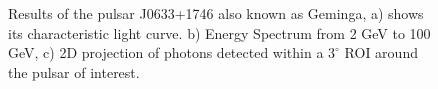 \documentclass{PoS}
\begin{document}
\begin{figure}
\centering
{}

\caption{Results of the pulsar J0633+1746 also known as Geminga, a)  shows its characteristic  light curve. b) Energy Spectrum from 2 GeV to 100 GeV, c) 2D projection of photons detected within a $ 3^{\circ}$ ROI around the pulsar of interest.}\label{geminga}
\end{figure}
\end{document}
